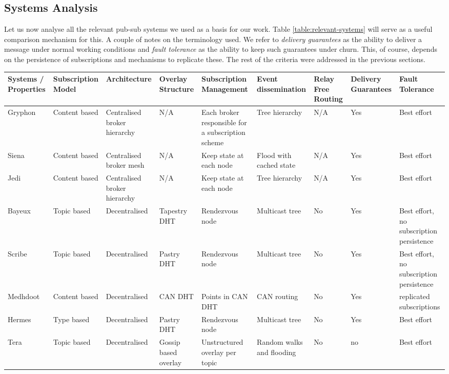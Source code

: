 \subsection{Systems Analysis}\label{systems-overview}

Let us now analyse all the relevant pub-sub systems we used as a basis for our
work. Table \ref{table:relevant-systems} will serve as a useful comparison
mechanism for this.  A couple of notes on the terminology used. We refer to
\emph{delivery guarantees} as the ability to deliver a message under normal
working conditions and \emph{fault tolerance} as the ability to keep such
guarantees under churn. This, of course, depends on the persistence of
subscriptions and mechanisms to replicate these. The rest of the criteria were
addressed in the previous sections.

\begin{table}
  \center
    \begin{tabular}{|P{3cm}|P{2cm}P{2cm}P{2cm}P{2.5cm}P{2cm}P{2cm}P{2cm}P{2cm}|}\hline
    Systems / Properties & Subscription Model & Architecture & Overlay Structure & Subscription Management & Event dissemination & Relay Free Routing & Delivery Guarantees & Fault Tolerance \\\hline
    Gryphon & Content based & Centralised broker hierarchy & N/A & Each broker responsible for a subscription scheme & Tree hierarchy & N/A & Yes & Best effort \\\hline
    Siena & Content based & Centralised broker mesh & N/A & Keep state at each node & Flood with cached state & N/A & Yes & Best effort \\\hline
    Jedi & Content based & Centralised broker hierarchy & N/A & Keep state at each node & Tree hierarchy & N/A & Yes & Best effort \\\hline
    Bayeux & Topic based & Decentralised & Tapestry DHT & Rendezvous node & Multicast tree & No & Yes & Best effort, no subscription persistence \\\hline
    Scribe & Topic based & Decentralised & Pastry DHT & Rendezvous node & Multicast tree & No & Yes & Best effort, no subscription persistence \\\hline
    Medhdoot & Content based & Decentralised & CAN DHT & Points in CAN DHT & CAN routing  & No & Yes & replicated subscriptions \\\hline
    Hermes & Type based & Decentralised & Pastry DHT & Rendezvous node & Multicast tree & No & Yes & Best effort \\\hline
    Tera & Topic based & Decentralised & Gossip based overlay & Unstructured overlay per topic & Random walks and flooding & No & no & Best effort \\\hline

\end{tabular}
\end{table}

